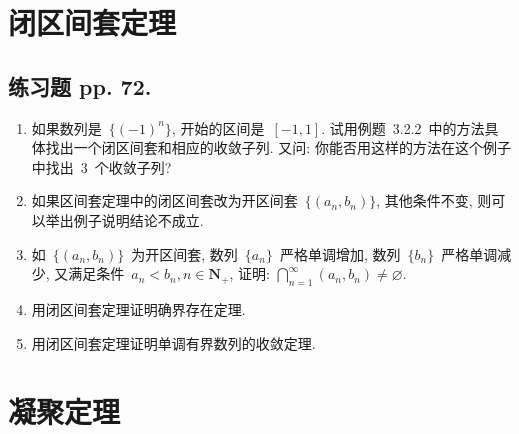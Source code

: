 \documentclass[UTF8,a4paper,11pt,twoside]{book}
\begin{document}
\section{闭区间套定理}
\subsection{练习题 pp. 72.}
\begin{enumerate}
	\item 如果数列是~$\{(-1)^n\}$, 开始的区间是~$[-1,1]$. 试用例题~3.2.2~中的方法具体找出一个闭区间套和相应的收敛子列. 又问: 你能否用这样的方法在这个例子中找出~$3$~个收敛子列?

	\item 如果区间套定理中的闭区间套改为开区间套~$\{(a_n,b_n)\}$, 其他条件不变, 则可以举出例子说明结论不成立.

	\item 如~$\{(a_n,b_n)\}$~为开区间套, 数列~$\{a_n\}$~严格单调增加, 数列~$\{b_n\}$~严格单调减少, 又满足条件~$a_n<b_n, n\in\mathbf{N}_{+}$, 证明: $\bigcap_{n=1}^{\infty}(a_n,b_n)\neq\varnothing$.

	\item 用闭区间套定理证明确界存在定理.

	\item 用闭区间套定理证明单调有界数列的收敛定理.
\end{enumerate}

\section{凝聚定理}
\end{document}
